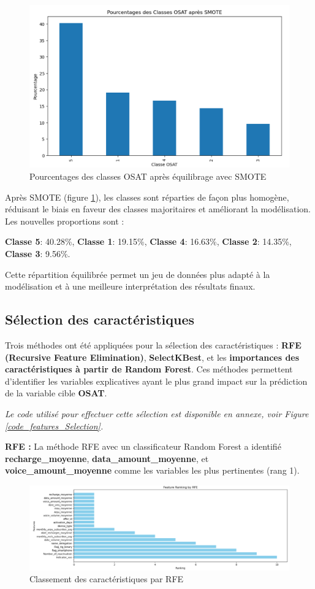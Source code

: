 \begin{figure}[H]
    \centering
    \includegraphics[width=0.7\linewidth]{capture_sas_59.png}
    \caption{Pourcentages des classes OSAT après équilibrage avec SMOTE}
    \label{smote_aprés}
\end{figure}

Après SMOTE (figure \ref{smote_aprés}), les classes sont réparties de façon plus homogène, réduisant le biais en faveur des classes majoritaires et améliorant la modélisation. Les nouvelles proportions sont :

\textbf{Classe 5}: 40.28\%, \textbf{Classe 1}: 19.15\%, \textbf{Classe 4}: 16.63\%, \textbf{Classe 2}: 14.35\%, \textbf{Classe 3}: 9.56\%.

Cette répartition équilibrée permet un jeu de données plus adapté à la modélisation et à une meilleure interprétation des résultats finaux.

\subsection{Sélection des caractéristiques}
Trois méthodes ont été appliquées pour la sélection des caractéristiques : \textbf{RFE (Recursive Feature Elimination)}, \textbf{SelectKBest}, et les \textbf{importances des caractéristiques à partir de Random Forest}. Ces méthodes permettent d'identifier les variables explicatives ayant le plus grand impact sur la prédiction de la variable cible \textbf{OSAT}. 

\textit{Le code utilisé pour effectuer cette sélection est disponible en annexe, voir Figure \ref{code_features_Selection}.}

\textbf{RFE :} La méthode RFE avec un classificateur Random Forest a identifié \textbf{recharge\_moyenne}, \textbf{data\_amount\_moyenne}, et \textbf{voice\_amount\_moyenne} comme les variables les plus pertinentes (rang 1). 

\begin{figure}[H]
    \centering
    \includegraphics[width=0.8\linewidth]{capture_sas_65.png}
    \caption{Classement des caractéristiques par RFE}
\end{figure}


